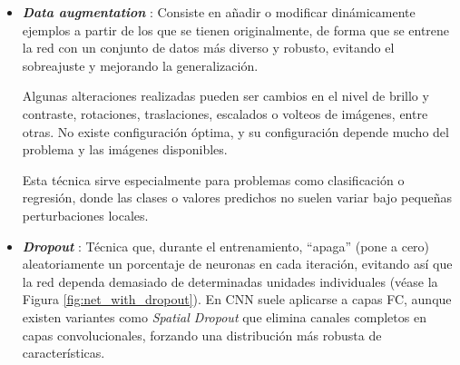 \begin{itemize}

    \item \textbf{\textit{Data augmentation}} \cite{chen2019,zhang2021}: Consiste en añadir o modificar dinámicamente ejemplos a partir de los que se tienen originalmente, de forma que se entrene la red con un conjunto de datos más diverso y robusto, evitando el sobreajuste y mejorando la generalización.
    
    Algunas alteraciones realizadas pueden ser cambios en el nivel de brillo y contraste, rotaciones, traslaciones, escalados o volteos de imágenes, entre otras. No existe configuración óptima, y su configuración depende mucho del problema y las imágenes disponibles.

    Esta técnica sirve especialmente para problemas como clasificación o regresión, donde las clases o valores predichos no suelen variar bajo pequeñas perturbaciones locales. 
    
    \item \textbf{\textit{Dropout}} \cite{srivastava2014}: Técnica que, durante el entrenamiento, ``apaga'' (pone a cero) aleatoriamente un porcentaje de neuronas en cada iteración, evitando así que la red dependa demasiado de determinadas unidades individuales (véase la Figura \ref{fig:net_with_dropout}). En \acrshort{CNN} suele aplicarse a capas \acrshort{FC}, aunque existen variantes como \textit{Spatial Dropout} \cite{tompson2015} que elimina canales completos en capas convolucionales, forzando una distribución más robusta de características.

    \begin{figure}[htbp]
        \centering


\end{figure}
\end{itemize}
